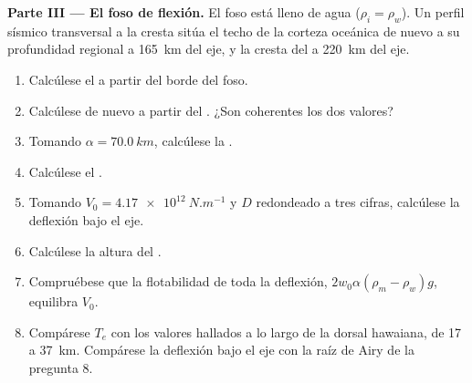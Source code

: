 \begin{problem}
\noindent\textbf{Parte III --- El foso de flexión.} El foso está lleno de agua
($\rho_i = \rho_w$). Un perfil sísmico transversal a la cresta sitúa el techo de la
corteza oceánica de nuevo a su profundidad regional a \qty{165}{km} del eje, y la
cresta del  a \qty{220}{km} del eje.
\begin{enumerate}[resume]
  \item Calcúlese el  a partir del borde del foso.
  \item Calcúlese de nuevo a partir del . ¿Son coherentes los dos valores?
  \item Tomando $\alpha = \qty{70.0}{km}$, calcúlese la .
  \item Calcúlese el .
  \item Tomando $V_0 = \qty{4.17e12}{N.m^{-1}}$ y $D$ redondeado a tres
        cifras, calcúlese la deflexión bajo el eje.
  \item Calcúlese la altura del .
  \item Compruébese que la flotabilidad de toda la deflexión, $2w_0\alpha(\rho_m -
        \rho_w)g$, equilibra $V_0$.
  \item Compárese $T_e$ con los valores hallados a lo largo de la dorsal hawaiana, de 17 a
        \qty{37}{km}. Compárese la deflexión bajo el eje con la raíz de Airy
        de la pregunta 8.
\end{enumerate}


\end{problem}
